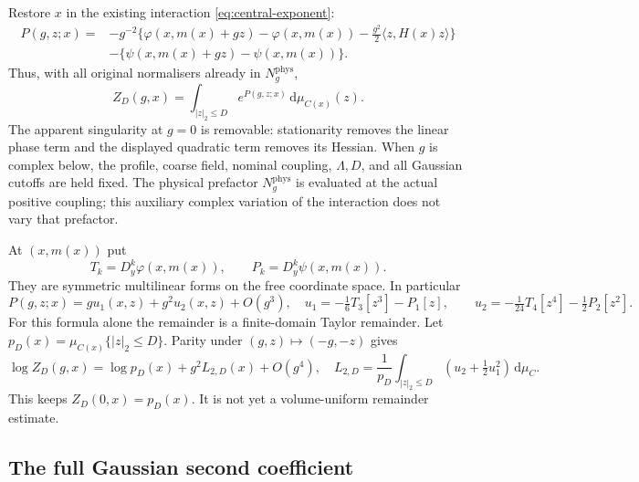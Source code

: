 \documentclass[11pt,reqno]{amsart}
\numberwithin{equation}{section}
\theoremstyle{definition}
\theoremstyle{remark}
\newcommand{\dd}{\mathrm d}
\begin{document}
Restore \(x\) in the existing interaction
\eqref{eq:central-exponent}:
\begin{equation}
 \begin{split}
 P(g,z;x)={}&-g^{-2}
     \{\varphi(x,m(x)+gz)-\varphi(x,m(x))
                         -\tfrac{g^2}{2}\langle z,H(x)z\rangle\}\\
           &-\{\psi(x,m(x)+gz)-\psi(x,m(x))\}.
 \end{split}
 \label{eq:connected-actual-interaction}
\end{equation}
Thus, with all original normalisers already in
\(N_g^{\mathrm{phys}}\),
\[
           Z_D(g,x)=\int_{|z|_2\le D}
                                e^{P(g,z;x)}\,\dd\mu_{C(x)}(z).
\]
The apparent singularity at \(g=0\) is removable:
stationarity removes the linear phase term and
the displayed quadratic term removes its Hessian.
When \(g\) is complex below, the profile, coarse
field, nominal coupling, \(\Lambda,D\), and all
Gaussian cutoffs are held fixed. The physical prefactor
\(N_g^{\mathrm{phys}}\) is evaluated at the actual positive
coupling; this auxiliary complex variation of the interaction
does not vary that prefactor.

At \((x,m(x))\) put
\[
               T_k=D_y^k\varphi(x,m(x)),\qquad
               P_k=D_y^k\psi(x,m(x)).
\]
They are symmetric multilinear forms on the free
coordinate space. In particular
\[
 P(g,z;x)=g u_1(x,z)+g^2u_2(x,z)+O(g^3),
 \quad
 u_1=-\tfrac16T_3[z^3]-P_1[z],\qquad
 u_2=-\tfrac1{24}T_4[z^4]-\tfrac12P_2[z^2].
\]
For this formula alone the remainder is a
finite-domain Taylor remainder.
Let \(p_D(x)=\mu_{C(x)}\{|z|_2\le D\}\).
Parity under \((g,z)\mapsto(-g,-z)\) gives
\begin{equation}
 \log Z_D(g,x)=\log p_D(x)+g^2L_{2,D}(x)+O(g^4),
 \quad
 L_{2,D}=\frac1{p_D}
       \int_{|z|_2\le D}(u_2+\tfrac12u_1^2)\,\dd\mu_C .
 \label{eq:connected-finite-second-coefficient}
\end{equation}
This keeps \(Z_D(0,x)=p_D(x)\).
It is not yet a volume-uniform remainder estimate.

\subsection{The full Gaussian second coefficient}
\end{document}
